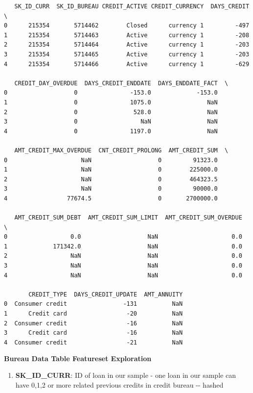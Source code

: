 \documentclass[11pt]{article}
\providecommand{\tightlist}{%
      \setlength{\itemsep}{0pt}\setlength{\parskip}{0pt}}
\begin{document}
    
    \begin{verbatim}
   SK_ID_CURR  SK_ID_BUREAU CREDIT_ACTIVE CREDIT_CURRENCY  DAYS_CREDIT  \
0      215354       5714462        Closed      currency 1         -497   
1      215354       5714463        Active      currency 1         -208   
2      215354       5714464        Active      currency 1         -203   
3      215354       5714465        Active      currency 1         -203   
4      215354       5714466        Active      currency 1         -629   

   CREDIT_DAY_OVERDUE  DAYS_CREDIT_ENDDATE  DAYS_ENDDATE_FACT  \
0                   0               -153.0             -153.0   
1                   0               1075.0                NaN   
2                   0                528.0                NaN   
3                   0                  NaN                NaN   
4                   0               1197.0                NaN   

   AMT_CREDIT_MAX_OVERDUE  CNT_CREDIT_PROLONG  AMT_CREDIT_SUM  \
0                     NaN                   0         91323.0   
1                     NaN                   0        225000.0   
2                     NaN                   0        464323.5   
3                     NaN                   0         90000.0   
4                 77674.5                   0       2700000.0   

   AMT_CREDIT_SUM_DEBT  AMT_CREDIT_SUM_LIMIT  AMT_CREDIT_SUM_OVERDUE  \
0                  0.0                   NaN                     0.0   
1             171342.0                   NaN                     0.0   
2                  NaN                   NaN                     0.0   
3                  NaN                   NaN                     0.0   
4                  NaN                   NaN                     0.0   

       CREDIT_TYPE  DAYS_CREDIT_UPDATE  AMT_ANNUITY  
0  Consumer credit                -131          NaN  
1      Credit card                 -20          NaN  
2  Consumer credit                 -16          NaN  
3      Credit card                 -16          NaN  
4  Consumer credit                 -21          NaN  
    \end{verbatim}

    
    \textbf{Bureau Data Table Featureset Exploration}

\begin{enumerate}
\def\labelenumi{\arabic{enumi}.}
\tightlist
\item
  \textbf{SK\_ID\_CURR}: ID of loan in our sample - one loan in our
  sample can have 0,1,2 or more related previous credits in credit
  bureau -\/- hashed
\end{enumerate}
\end{document}
